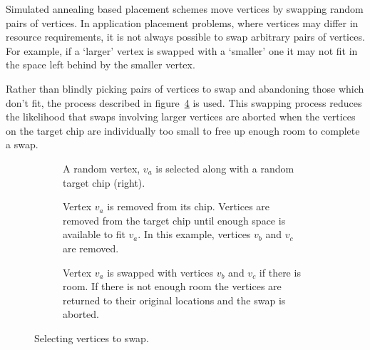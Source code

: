				Simulated annealing based placement schemes move vertices by swapping
				random pairs of vertices. In application placement problems, where
				vertices may differ in resource requirements, it is not always possible
				to swap arbitrary pairs of vertices. For example, if a `larger' vertex
				is swapped with a `smaller' one it may not fit in the space left behind
				by the smaller vertex.
				
				Rather than blindly picking pairs of vertices to swap and abandoning
				those which don't fit, the process described in
				figure~\ref{fig:sa-swap} is used. This swapping process reduces the
				likelihood that swaps involving larger vertices are aborted when the
				vertices on the target chip are individually too small to free up
				enough room to complete a swap.
				
				\begin{figure}
					\center
					\begin{subfigure}{\linewidth}
						\center
						\caption{A random vertex, $v_a$ is selected along with a random
						target chip (right).}
						\label{fig:sa-swap-select}
					\end{subfigure}
					
					\vspace*{1em}
					
					\begin{subfigure}{\linewidth}
						\center
						\caption{Vertex $v_a$ is removed from its chip. Vertices are removed
						from the target chip until enough space is available to fit $v_a$.
						In this example, vertices $v_b$ and $v_c$ are removed.}
						\label{fig:sa-swap-remove}
					\end{subfigure}
					
					\vspace*{1em}
					
					\begin{subfigure}{\linewidth}
						\center
						\caption{Vertex $v_a$ is swapped with vertices $v_b$ and $v_c$ if
						there is room. If there is not enough room the vertices are
						returned to their original locations and the swap is aborted.}
						\label{fig:sa-swap-commit}
					\end{subfigure}
					
					\caption{Selecting vertices to swap.}
					\label{fig:sa-swap}
				\end{figure}
			
